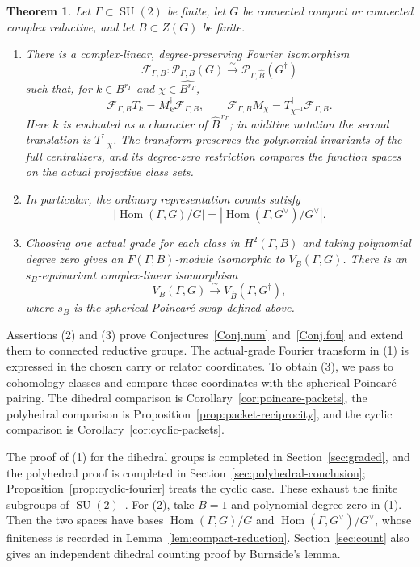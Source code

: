 \documentclass[11pt,a4paper,reqno]{amsart}
\theoremstyle{plain}
\newtheorem{theorem}{Theorem}[section]
\theoremstyle{definition}
\theoremstyle{remark}
\numberwithin{equation}{section}
\DeclareMathOperator{\Hom}{Hom}
\newcommand{\SU}{\operatorname{SU}}
\begin{document}
\begin{theorem}\label{thm:unified}
Let $\Gamma\subset\SU(2)$ be finite, let $G$ be connected compact or connected complex reductive, and let $B\subset Z(G)$ be finite.
\begin{enumerate}[label=\textup{(\arabic*)},leftmargin=2em]
\item There is a complex-linear, degree-preserving Fourier isomorphism
\[
\mathcal F_{\Gamma,B}\colon\mathscr P_{\Gamma,B}(G) \xrightarrow{\sim}\mathscr P_{\Gamma,\widehat B}(G^\dagger)
\]
such that, for $k\in B^{r_\Gamma}$ and $\chi\in\widehat{B^{r_\Gamma}}$,
\[
\mathcal F_{\Gamma,B}T_k=M_k^\dagger\mathcal F_{\Gamma,B}, \qquad \mathcal F_{\Gamma,B}M_\chi=T_{\chi^{-1}}^\dagger\mathcal F_{\Gamma,B}.
\]
Here $k$ is evaluated as a character of $\widehat B^{\,r_\Gamma}$; in additive notation the second translation is $T_{-\chi}^\dagger$. The transform preserves the polynomial invariants of the full centralizers, and its degree-zero restriction compares the function spaces on the actual projective class sets.
\item In particular, the ordinary representation counts satisfy
\[
|\Hom(\Gamma,G)/G|=|\Hom(\Gamma,G^\vee)/G^\vee|.
\]
\item Choosing one actual grade for each class in $H^2(\Gamma,B)$ and taking polynomial degree zero gives an $F(\Gamma;B)$-module isomorphic to $V_B(\Gamma,G)$. There is an $s_B$-equivariant complex-linear isomorphism
\[
V_B(\Gamma,G)\xrightarrow{\sim}V_{\widehat B}(\Gamma,G^\dagger),
\]
where $s_B$ is the spherical Poincar\'e swap defined above.
\end{enumerate}
\end{theorem}

Assertions \textup{(2)} and \textup{(3)} prove Conjectures~\ref{Conj.num} and~\ref{Conj.fou} and extend them to connected reductive groups. The actual-grade Fourier transform in \textup{(1)} is expressed in the chosen carry or relator coordinates. To obtain \textup{(3)}, we pass to cohomology classes and compare those coordinates with the spherical Poincar\'e pairing. The dihedral comparison is Corollary~\ref{cor:poincare-packets}, the polyhedral comparison is Proposition~\ref{prop:packet-reciprocity}, and the cyclic comparison is Corollary~\ref{cor:cyclic-packets}.

The proof of \textup{(1)} for the dihedral groups is completed in Section~\ref{sec:graded}, and the polyhedral proof is completed in Section~\ref{sec:polyhedral-conclusion}; Proposition~\ref{prop:cyclic-fourier} treats the cyclic case. These exhaust the finite subgroups of $\SU(2)$~\cite{coxeter}. For \textup{(2)}, take $B=1$ and polynomial degree zero in \textup{(1)}. Then the two spaces have bases $\Hom(\Gamma,G)/G$ and $\Hom(\Gamma,G^\vee)/G^\vee$, whose finiteness is recorded in Lemma~\ref{lem:compact-reduction}. Section~\ref{sec:count} also gives an independent dihedral counting proof by Burnside's lemma.
\end{document}

